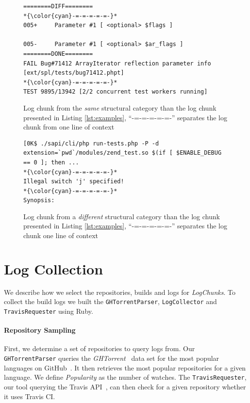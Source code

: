\documentclass[\myrootdir/main.tex]{subfiles}
\begin{document}
\begin{figure}[]
	\centering
\begin{lstlisting}[breaklines=true]
========DIFF========
*{\color{cyan}-=-=-=-=-=-}*
005+     Parameter #1 [ <optional> $flags ]

005-     Parameter #1 [ <optional> $ar_flags ]
========DONE========
FAIL Bug#71412 ArrayIterator reflection parameter info [ext/spl/tests/bug71412.phpt] 
*{\color{cyan}-=-=-=-=-=-}*
TEST 9895/13942 [2/2 concurrent test workers running]
\end{lstlisting}
	\caption[Log chunk from the \emph{same} structural category than the log chunk presented in Listing \ref{lst:examples}]{Log chunk from the \emph{same} structural category than the log chunk presented in Listing \ref{lst:examples}, ``{\color{cyan}-=-=-=-=-=-}'' separates the log chunk from one line of context}
	\label{lst:same-category}
\end{figure}

\begin{figure}[]
	\centering
\begin{lstlisting}[breaklines=true]
[0K$ ./sapi/cli/php run-tests.php -P -d extension=`pwd`/modules/zend_test.so $(if [ $ENABLE_DEBUG == 0 ]; then ...
*{\color{cyan}-=-=-=-=-=-}*
Illegal switch 'j' specified!
*{\color{cyan}-=-=-=-=-=-}*
Synopsis:
\end{lstlisting}
	\caption[Log chunk from a \emph{different} structural category than the log chunk presented in Listing \ref{lst:examples}]{Log chunk from a \emph{different} structural category than the log chunk presented in Listing \ref{lst:examples}, ``{\color{cyan}-=-=-=-=-=-}'' separates the log chunk one line of context}
	\label{lst:different-category}
\end{figure}

\section{Log Collection}
We describe how we select the repositories, builds and logs for \emph{LogChunks}.
To collect the build logs we built the  \texttt{GHTorrentParser}, \texttt{LogCollector} and \texttt{TravisRequester} using Ruby.

\paragraph{Repository Sampling}
First, we determine a set of repositories to query logs from.
Our \texttt{GHTorrentParser} queries the \emph{GHTorrent}~\cite{gousios2013ghtorrent} data set for the most popular languages on GitHub~\cite{github2019website}.
It then retrieves the most popular repositories for a given language.
We define \emph{Popularity} as the number of watches.
The \texttt{TravisRequester}, our tool querying the Travis API~\cite{travisci2019apidoc}, can then check for a given repository whether it uses Travis CI\@.
\end{document}
